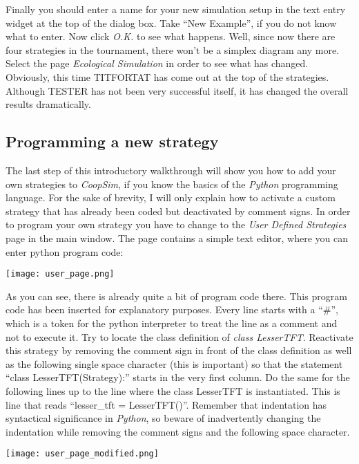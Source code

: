 \documentclass[12pt,a4paper,USenglish]{article}
\begin{document}
Finally you should enter a name for your new simulation setup in the
text entry widget at the top of the dialog box. Take ``New Example'',
if you do not know what to enter. Now click \emph{O.K.} to see what
happens. Well, since now there are four strategies in the tournament,
there won't be a simplex diagram any more. Select the page \emph{Ecological
Simulation} in order to see what has changed. Obviously, this time
TITFORTAT has come out at the top of the strategies. Although TESTER
has not been very successful itself, it has changed the overall results
dramatically.


\subsection{Programming a new strategy}

The last step of this introductory walkthrough will show you how
to add your own strategies to \emph{CoopSim}, if you know the basics
of the \emph{Python} programming language. For the sake of brevity,
I will only explain how to activate a custom strategy that has already
been coded but deactivated by comment signs. In order to program your
own strategy you have to change to the \emph{User Defined Strategies}
page in the main window. The page contains a simple text editor, where
you can enter python program code:

\begin{center}\texttt{[image: user\_page.png]}\end{center}

As you can see, there is already quite a bit of program code there.  This
program code has been inserted for explanatory purposes.  Every line starts
with a ``\#'', which is a token for the python interpreter to treat the line
as a comment and not to execute it. Try to locate the class definition of
\emph{class LesserTFT}.  Reactivate this strategy by removing the comment sign
in front of the class definition as well as the following single space
character (this is important) so that the statement ``class
LesserTFT(Strategy):'' starts in the very first column. Do the same for the
following lines up to the line where the class LesserTFT is instantiated. This
is line that reads ``lesser\_tft = LesserTFT()''. Remember that indentation
has syntactical significance in \emph{Python}, so beware of inadvertently
changing the indentation while removing the comment signs and the following
space character.

\begin{center}\texttt{[image: user\_page\_modified.png]}\end{center}
\end{document}
